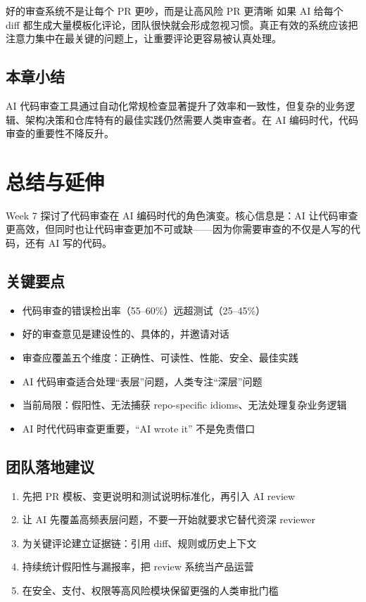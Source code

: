 \documentclass[a4paper]{article}
\begin{document}
\begin{knowledgebox}{好的审查系统不是让每个 PR 更吵，而是让高风险 PR 更清晰}
如果 AI 给每个 diff 都生成大量模板化评论，团队很快就会形成忽视习惯。真正有效的系统应该把注意力集中在最关键的问题上，让重要评论更容易被认真处理。
\end{knowledgebox}

\subsection{本章小结}

AI 代码审查工具通过自动化常规检查显著提升了效率和一致性，但复杂的业务逻辑、架构决策和仓库特有的最佳实践仍然需要人类审查者。在 AI 编码时代，代码审查的重要性不降反升。

\section{总结与延伸}

Week 7 探讨了代码审查在 AI 编码时代的角色演变。核心信息是：AI 让代码审查更高效，但同时也让代码审查更加不可或缺——因为你需要审查的不仅是人写的代码，还有 AI 写的代码。

\subsection{关键要点}

\begin{itemize}
    \item 代码审查的错误检出率（55--60\%）远超测试（25--45\%）
    \item 好的审查意见是建设性的、具体的，并邀请对话
    \item 审查应覆盖五个维度：正确性、可读性、性能、安全、最佳实践
    \item AI 代码审查适合处理``表层''问题，人类专注``深层''问题
    \item 当前局限：假阳性、无法捕获 repo-specific idioms、无法处理复杂业务逻辑
    \item AI 时代代码审查更重要，``AI wrote it'' 不是免责借口
\end{itemize}

\subsection{团队落地建议}

\begin{enumerate}
    \item 先把 PR 模板、变更说明和测试说明标准化，再引入 AI review
    \item 让 AI 先覆盖高频表层问题，不要一开始就要求它替代资深 reviewer
    \item 为关键评论建立证据链：引用 diff、规则或历史上下文
    \item 持续统计假阳性与漏报率，把 review 系统当产品运营
    \item 在安全、支付、权限等高风险模块保留更强的人类审批门槛
\end{enumerate}
\end{document}
